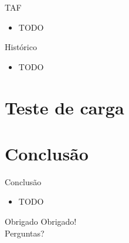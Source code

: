 \documentclass{beamer}
\begin{document}
\begin{frame}{TAF}
    \begin{itemize}
        \item TODO
    \end{itemize}
\end{frame}

\begin{frame}{Histórico}
    \begin{itemize}
        \item TODO
    \end{itemize}
\end{frame}

\section{Teste de carga}

\section{Conclusão}

\begin{frame}{Conclusão}
    \begin{itemize}
        \item TODO
    \end{itemize}
\end{frame}

\begin{frame}{Obrigado}
    \centering
    \Huge Obrigado! \\
    \normalsize Perguntas?
\end{frame}
\end{document}
